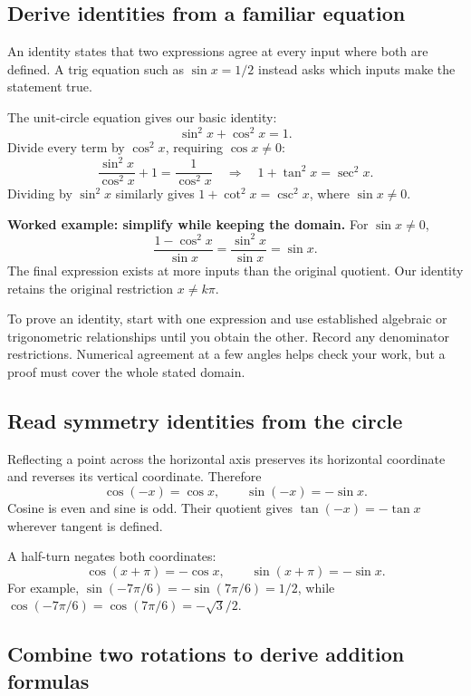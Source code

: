 \hypertarget{m4-derive-identities-from-a-familiar-equation}{%
\subsection{Derive identities from a familiar equation}\label{m4-derive-identities-from-a-familiar-equation}}

An identity states that two expressions agree at every input where both are defined. A trig equation such as \(\sin x=1/2\) instead asks which inputs make the statement true.

The unit-circle equation gives our basic identity: \[
\sin^2x+\cos^2x=1.
\] Divide every term by \(\cos^2x\), requiring \(\cos x\ne0\): \[
\frac{\sin^2x}{\cos^2x}+1=\frac1{\cos^2x}
\quad\Longrightarrow\quad
1+\tan^2x=\sec^2x.
\] Dividing by \(\sin^2x\) similarly gives \(1+\cot^2x=\csc^2x\), where \(\sin x\ne0\).

\textbf{Worked example: simplify while keeping the domain.} For \(\sin x\ne0\), \[
\frac{1-\cos^2x}{\sin x}
=\frac{\sin^2x}{\sin x}=\sin x.
\] The final expression exists at more inputs than the original quotient. Our identity retains the original restriction \(x\ne k\pi\).

To prove an identity, start with one expression and use established algebraic or trigonometric relationships until you obtain the other. Record any denominator restrictions. Numerical agreement at a few angles helps check your work, but a proof must cover the whole stated domain.

\hypertarget{m4-read-symmetry-identities-from-the-circle}{%
\subsection{Read symmetry identities from the circle}\label{m4-read-symmetry-identities-from-the-circle}}

Reflecting a point across the horizontal axis preserves its horizontal coordinate and reverses its vertical coordinate. Therefore \[
\cos(-x)=\cos x,\qquad \sin(-x)=-\sin x.
\] Cosine is even and sine is odd. Their quotient gives \(\tan(-x)=-\tan x\) wherever tangent is defined.

A half-turn negates both coordinates: \[
\cos(x+\pi)=-\cos x,\qquad
\sin(x+\pi)=-\sin x.
\] For example, \(\sin(-7\pi/6)=-\sin(7\pi/6)=1/2\), while \(\cos(-7\pi/6)=\cos(7\pi/6)=-\sqrt3/2\).

\hypertarget{m4-combine-two-rotations-to-derive-addition-formulas}{%
\subsection{Combine two rotations to derive addition formulas}\label{m4-combine-two-rotations-to-derive-addition-formulas}}

